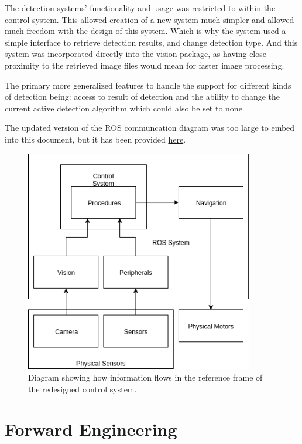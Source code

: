 The detection systems' functionality and usage was restricted to within the control system. This allowed creation of a new system much simpler and allowed much freedom with the design of this system. Which is why the system used a simple interface to retrieve detection results, and change detection type. And this system was incorporated directly into the vision package, as having close proximity to the retrieved image files would mean for faster image processing.

The primary more generalized features to handle the support for different kinds of detection being: access to result of detection and the ability to change the current active detection algorithm which could also be set to none.

The updated version of the ROS communcation diagram was too large to embed into
this document, but it has been provided \href{https://drive.google.com/file/d/1_vJLSflxahA-7v2kYGV3wu5SfGcKEVf8/view?usp=sharing}{here}.

\begin{figure}
\centering
\includegraphics[width=100mm]{Figures/InformationFlowNew}
\decoRule
\caption[New Information Flow]{Diagram showing how information flows in the reference frame of the redesigned control system.}
\label{fig:InformationFlowNew}
\end{figure}


\section{Forward Engineering}

